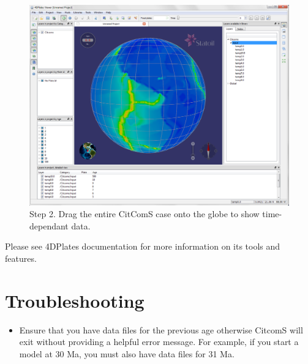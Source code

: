 \documentclass[letterpaper,12pt]{article}
\begin{document}
\begin{figure}[htb]
\centering
\includegraphics[width=1.0\textwidth]{figs/4DPlates_step2.png}
\caption{Step 2. Drag the entire CitComS case onto the globe to show time-dependant data. }
\label{fig:cont2ps}
\end{figure}

Please see 4DPlates documentation for more information on its tools and features.

\newpage





\appendix
\section{Troubleshooting}
\begin{itemize}
\item Ensure that you have data files for the previous age otherwise CitcomS will exit without providing a helpful error message.  For example, if you start a model at 30 Ma, you must also have data files for 31 Ma.
\end{itemize}
\end{document}
